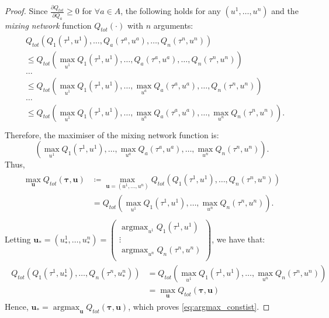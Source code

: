 \documentclass[twoside,11pt]{article}
\DeclareMathOperator*{\argmax}{argmax}
\begin{document}
	\begin{proof}
	Since $\frac{\partial Q_{tot}}{\partial Q_a}\geq 0$ for $\forall a\in A$, the following holds for any $(u^1, \dots, u^n)$ and the \textit{mixing network} function $Q_{tot}(\cdot)$ with $n$ arguments:
	\begin{align}
	\nonumber
	\begin{split}
	&Q_{tot}(Q_1(\tau^1, {u}^1), \dots, Q_a(\tau^a, {u}^a), \dots, Q_n(\tau^n, {u}^n)) \\
	&\leq Q_{tot}(\max_{u^1}Q_1(\tau^1, u^1), \dots, Q_a(\tau^a, u^a), \dots, Q_n(\tau^n, {u}^n))\\
	&\dots\\
	&\leq Q_{tot}(\max_{u^1}Q_1(\tau^1, u^1), \dots, \max_{u^a}Q_a(\tau^a, u^a), \dots, Q_n(\tau^n, {u}^n))\\
	&\dots\\
	&\leq Q_{tot}(\max_{u^1}Q_1(\tau^1, u^1), \dots, \max_{u^a}Q_a(\tau^a, u^a), \dots, \max_{u^n}Q_n(\tau^n, {u}^n)). \\
	\end{split}
	\end{align}
	Therefore, 
	the maximiser of the mixing network function is: $$(\max_{u^1}Q_1(\tau^1, u^1), \dots, \max_{u^a}Q_a(\tau^a, u^a), \dots, \max_{u^n}Q_n(\tau^n, {u}^n)).$$
	Thus,
	\begin{align}
	\nonumber
	\begin{split}
	\max_{\mathbf{u}}Q_{tot}(\boldsymbol{\tau}, \mathbf{u}) &\coloneqq \max_{\mathbf{u} = (u^1, \dots, u^n)} Q_{tot}(Q_1(\tau^1, {u}^1), \dots, Q_n(\tau^n, {u}^n))\\
	&= Q_{tot}(\max_{u^1}Q_1(\tau^1, u^1), \dots, \max_{u^n}Q_n(\tau^n, {u}^n)).\\
	\end{split}
	\end{align}
	Letting $\mathbf{u}_* = (u_*^1,\dots,u_*^n) = \begin{pmatrix}
		\argmax_{u^1}Q_1(\tau^1, u^1)   \\
		\vdots \\
		\argmax_{u^n}Q_n(\tau^n, u^n) \\
		\end{pmatrix}$,
	we have that:
	\begin{align}
	\nonumber
	\begin{split}
	Q_{tot}(Q_1(\tau^1, {u}_*^1), \dots, Q_n(\tau^n, {u}_*^n))
	&= Q_{tot}(\max_{u^1}Q_1(\tau^1, u^1), \dots, \max_{u^n}Q_n(\tau^n, {u}^n))\\
	&= \max_{\mathbf{u}}Q_{tot}(\boldsymbol{\tau}, \mathbf{u})
	\end{split}
	\end{align}
	Hence, $\mathbf{u}_* =  \argmax_{\mathbf{u}}Q_{tot}(\boldsymbol{\tau}, \mathbf{u})$, 
	which proves \eqref{eq:argmax_constist}.
	\end{proof}
\end{document}
